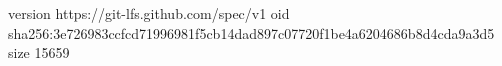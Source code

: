 version https://git-lfs.github.com/spec/v1
oid sha256:3e726983ccfcd71996981f5cb14dad897c07720f1be4a6204686b8d4cda9a3d5
size 15659

